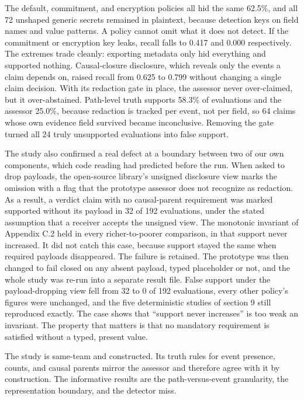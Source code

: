 \documentclass[
  american,
  10pt,
  a4paper,
]{article}
\begin{document}
The default, commitment, and encryption policies all hid the same
62.5\%, and all 72 unshaped generic secrets remained in plaintext,
because detection keys on field names and value patterns. A policy
cannot omit what it does not detect. If the commitment or encryption key
leaks, recall falls to 0.417 and 0.000 respectively. The extremes trade
cleanly: exporting metadata only hid everything and supported nothing.
Causal-closure disclosure, which reveals only the events a claim depends
on, raised recall from 0.625 to 0.799 without changing a single claim
decision. With its redaction gate in place, the assessor never
over-claimed, but it over-abstained. Path-level truth supports 58.3\% of
evaluations and the assessor 25.0\%, because redaction is tracked per
event, not per field, so 64 claims whose own evidence field survived
became inconclusive. Removing the gate turned all 24 truly unsupported
evaluations into false support.

The study also confirmed a real defect at a boundary between two of our
own components, which code reading had predicted before the run. When
asked to drop payloads, the open-source library's unsigned disclosure
view marks the omission with a flag that the prototype assessor does not
recognize as redaction. As a result, a verdict claim with no
causal-parent requirement was marked supported without its payload in 32
of 192 evaluations, under the stated assumption that a receiver accepts
the unsigned view. The monotonic invariant of Appendix C.2 held in every
richer-to-poorer comparison, in that support never increased. It did not
catch this case, because support stayed the same when required payloads
disappeared. The failure is retained. The prototype was then changed to
fail closed on any absent payload, typed placeholder or not, and the
whole study was re-run into a separate result file. False support under
the payload-dropping view fell from 32 to 0 of 192 evaluations, every
other policy's figures were unchanged, and the five deterministic
studies of section 9 still reproduced exactly. The case shows that
``support never increases'' is too weak an invariant. The property that
matters is that no mandatory requirement is satisfied without a typed,
present value.

The study is same-team and constructed. Its truth rules for event
presence, counts, and causal parents mirror the assessor and therefore
agree with it by construction. The informative results are the
path-versus-event granularity, the representation boundary, and the
detector miss.
\end{document}
